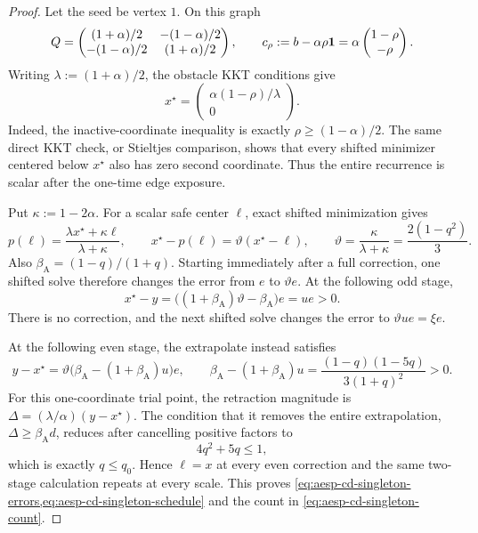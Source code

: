 \begin{proof}
Let the seed be vertex $1$.  On this graph
\begin{equation*}
 Q=\begin{pmatrix}
 (1+\alpha)/2&-(1-\alpha)/2\\
 -(1-\alpha)/2&(1+\alpha)/2
 \end{pmatrix},
 \qquad
 c_\rho:=b-\alpha\rho\mathbf{1}
 =\alpha\begin{pmatrix}1-\rho\\-\rho\end{pmatrix}.
\end{equation*}
Writing $\lambda:=(1+\alpha)/2$, the obstacle KKT conditions give
\begin{equation*}
 x^\star
 =\begin{pmatrix}\alpha(1-\rho)/\lambda\\0\end{pmatrix}.
\end{equation*}
Indeed, the inactive-coordinate inequality is exactly
$\rho\geq(1-\alpha)/2$.  The same direct KKT check, or Stieltjes comparison,
shows that every shifted minimizer centered below $x^\star$ also has zero
second coordinate.  Thus the entire recurrence is scalar after the one-time
edge exposure.

Put $\kappa:=1-2\alpha$.  For a scalar safe center $\ell$, exact shifted
minimization gives
\begin{equation*}
 p(\ell)=\frac{\lambda x^\star+\kappa\ell}{\lambda+\kappa},
 \qquad
 x^\star-p(\ell)=\vartheta(x^\star-\ell),
 \qquad
 \vartheta=\frac{\kappa}{\lambda+\kappa}
            =\frac{2(1-q^2)}3.
\end{equation*}
Also $\beta_{\mathrm A}=(1-q)/(1+q)$.  Starting immediately after a full
correction, one shifted solve therefore changes the error from $e$ to
$\vartheta e$.  At the following odd stage,
\begin{equation*}
 x^\star-y
 =\bigl((1+\beta_{\mathrm A})\vartheta
        -\beta_{\mathrm A}\bigr)e
 =ue>0.
\end{equation*}
There is no correction, and the next shifted solve changes the error to
$\vartheta ue=\xi e$.

At the following even stage, the extrapolate instead satisfies
\begin{equation*}
 y-x^\star
 =\vartheta\bigl(\beta_{\mathrm A}
            -(1+\beta_{\mathrm A})u\bigr)e,
 \qquad
 \beta_{\mathrm A}-(1+\beta_{\mathrm A})u
 =\frac{(1-q)(1-5q)}{3(1+q)^2}>0.
\end{equation*}
For this one-coordinate trial point, the retraction magnitude is
$\Delta=(\lambda/\alpha)(y-x^\star)$.  The condition that it removes the
entire extrapolation, $\Delta\geq\beta_{\mathrm A}d$, reduces after
cancelling positive factors to
\begin{equation*}
 4q^2+5q\leq1,
\end{equation*}
which is exactly $q\leq q_0$.  Hence $\ell=x$ at every even correction and
the same two-stage calculation repeats at every scale.  This proves
\cref{eq:aesp-cd-singleton-errors,eq:aesp-cd-singleton-schedule} and the
count in \cref{eq:aesp-cd-singleton-count}.


\end{proof}
